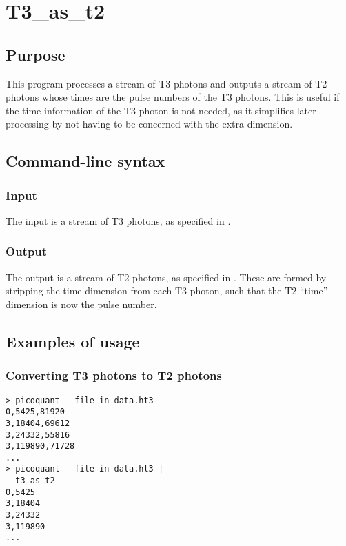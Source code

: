 \section{T3\_as\_t2}
\subsection{Purpose}
This program processes a stream of T3 photons and outputs a stream of T2 photons whose times are the pulse numbers of the T3 photons. This is useful if the time information of the T3 photon is not needed, as it simplifies later processing by not having to be concerned with the extra dimension.

\subsection{Command-line syntax}
%

\subsubsection{Input}
The input is a stream of T3 photons, as specified in .

\subsubsection{Output}
The output is a stream of T2 photons, as specified in . These are formed by stripping the time dimension from each T3 photon, such that the T2 ``time'' dimension is now the pulse number.

\subsection{Examples of usage}
\subsubsection{Converting T3 photons to T2 photons}
\begin{verbatim}
> picoquant --file-in data.ht3 
0,5425,81920
3,18404,69612
3,24332,55816
3,119890,71728
...
> picoquant --file-in data.ht3 |
  t3_as_t2
0,5425
3,18404
3,24332
3,119890
...
\end{verbatim}